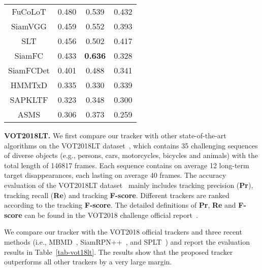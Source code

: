 \documentclass[10pt,twocolumn,letterpaper]{article}
\begin{document}
\begin{table}[htbp]
\begin{center}
\begin{tabular}{cccc}
FuCoLoT           & 0.480                                 & 0.539                                 & 0.432                             \\
SiamVGG          & 0.459                                 & 0.552                                 & 0.393                             \\
SLT                    & 0.456                                 & 0.502                                 & 0.417                             \\
SiamFC              & 0.433                                 & {\color[HTML]{32CB00} \textbf{0.636}} & 0.328  \\
SiamFCDet        & 0.401                                 & 0.488                                 & 0.341                              \\
HMMTxD         & 0.335                                 & 0.330                                 & 0.339                               \\
SAPKLTF          & 0.323                                 & 0.348                                 & 0.300                               \\
ASMS                & 0.306                                 & 0.373                                 & 0.259                               \\
\hline
\end{tabular}
\end{center}
\vspace{-5mm}
\end{table}

\noindent \textbf{VOT2018LT.}
We first compare our tracker with other state-of-the-art algorithms on the VOT2018LT
dataset~\cite{VOT2018report}, which contains 35 challenging sequences of diverse objects (e.g., persons,
cars, motorcycles, bicycles and animals) with the total length of 146817 frames.
Each sequence contains on average 12 long-term target disappearances, each lasting on average 40 frames.
The accuracy evaluation of the VOT2018LT dataset~\cite{VOT2018report} mainly includes tracking
precision (\textbf{Pr}), tracking recall (\textbf{Re}) and tracking \textbf{F-score}.
Different trackers are ranked according to the tracking \textbf{F-score}.
The detailed definitions of \textbf{Pr}, \textbf{Re} and \textbf{F-score} can be found in the VOT2018 challenge
official report~\cite{VOT2018report}.

We compare our tracker with the VOT2018 official trackers and three recent methods (i.e.,
MBMD~\cite{Zhang-VOT18-MBMD}, SiamRPN++~\cite{SiamRPNplus}, and SPLT~\cite{Yan-ICCV19-SPLT})
and report the evaluation results in Table~\ref{tab-vot18lt}.
The results show that the proposed tracker outperforms all other trackers by a very large margin.
\end{document}
